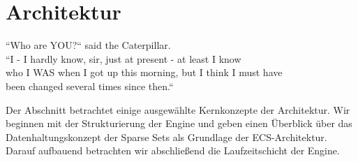
\chapter{Architektur}

\vspace{5mm}
\begin{displayquote}
    ``Who are YOU{?}`` said the Caterpillar.\\
    ``I - I hardly know, sir, just at present - at least I know\\
    who I WAS when I got up this morning, but I think I must have\\
    been changed several times since then.``
    \par\hfill\cite{Car65}
\end{displayquote}
\vspace{25mm}

Der Abschnitt betrachtet einige ausgewählte Kernkonzepte der Architektur.
Wir beginnen mit der Strukturierung der Engine und geben einen Überblick über das Datenhaltungskonzept der Sparse Sets als Grundlage der ECS-Architektur.
Darauf aufbauend betrachten wir abschließend die Laufzeitschicht der Engine.



\clearpage


\clearpage


\clearpage

